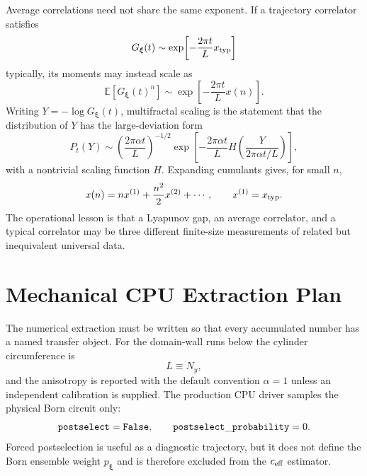 \documentclass[aps,prb,onecolumn,nofootinbib,superscriptaddress]{revtex4-2}
\newcommand{\E}{\mathbb{E}}
\newcommand{\bxi}{{\boldsymbol{\xi}}}
\theoremstyle{plain}
\theoremstyle{definition}
\begin{document}
Average correlations need not share the same exponent.  If a trajectory
correlator satisfies
\begin{equation}
  G_\bxi(t)\sim
  \exp\!\left[-\frac{2\pi t}{L}x_{\rm typ}\right]
  \label{eq:typical-correlator}
\end{equation}
typically, its moments may instead scale as
\begin{equation}
  \E\!\left[G_\bxi(t)^n\right]
  \sim
  \exp\!\left[-\frac{2\pi t}{L}x(n)\right].
  \label{eq:moment-exponents}
\end{equation}
Writing \(Y=-\log G_\bxi(t)\), multifractal scaling is the statement that
the distribution of \(Y\) has the large-deviation form~\cite{EversMirlin2008}
\begin{equation}
  P_t(Y)
  \sim
  \left(\frac{2\pi\alpha t}{L}\right)^{-1/2}
  \exp\!\left[
    -\frac{2\pi\alpha t}{L}
    H\!\left(\frac{Y}{2\pi\alpha t/L}\right)
  \right],
  \label{eq:multifractal-distribution}
\end{equation}
with a nontrivial scaling function \(H\).  Expanding cumulants gives, for
small \(n\),
\begin{equation}
  x(n)=n x^{(1)}+\frac{n^2}{2}x^{(2)}+\cdots ,
  \qquad
  x^{(1)}=x_{\rm typ}.
  \label{eq:cumulant-expansion}
\end{equation}
The operational lesson is that a Lyapunov gap, an average correlator, and a
typical correlator may be three different finite-size measurements of related
but inequivalent universal data.

\section{Mechanical CPU Extraction Plan}
\label{sec:practical-protocol}

The numerical extraction must be written so that every accumulated number has
a named transfer object.  For the domain-wall runs below the cylinder
circumference is
\begin{equation}
  L \equiv N_y ,
  \label{eq:cpu-circumference}
\end{equation}
and the anisotropy is reported with the default convention \(\alpha=1\) unless
an independent calibration is supplied.  The production CPU driver samples the
physical Born circuit only:
\begin{equation}
  {\tt postselect}={\tt False},
  \qquad
  {\tt postselect\_probability}=0 .
  \label{eq:cpu-no-postselect}
\end{equation}
Forced postselection is useful as a diagnostic trajectory, but it does not
define the Born ensemble weight \(p_\bxi\) and is therefore excluded from the
\(c_{\rm eff}\) estimator.
\end{document}
